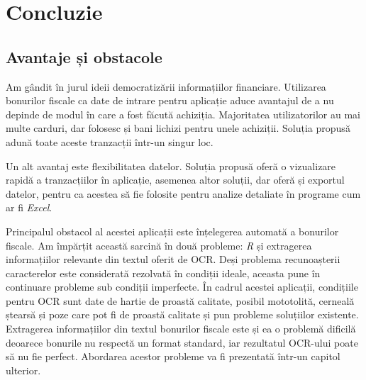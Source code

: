 \chapter{Concluzie}

\section{Avantaje și obstacole}\label{avantaje_obstacole_intro}

Am gândit \AppName{} în jurul ideii democratizării informațiilor financiare. Utilizarea bonurilor fiscale ca date de intrare pentru aplicație aduce avantajul de a nu depinde de modul în care a fost făcută achiziția. Majoritatea utilizatorilor au mai multe carduri, dar folosesc și bani lichizi pentru unele achiziții. Soluția propusă adună toate aceste tranzacții într-un singur loc.

Un alt avantaj este flexibilitatea datelor. Soluția propusă oferă o vizualizare rapidă a tranzacțiilor în aplicație, asemenea altor soluții, dar oferă și exportul datelor, pentru ca acestea să fie folosite pentru analize detaliate în programe cum ar fi \emph{Excel}.

Principalul obstacol al acestei aplicații este înțelegerea automată a bonurilor fiscale. Am împărțit această sarcină în două probleme: \emph{R} și extragerea informațiilor relevante din textul oferit de OCR. Deși problema recunoașterii caracterelor este considerată rezolvată în condiții ideale, aceasta pune în continuare probleme sub condiții imperfecte. În cadrul acestei aplicații, condițiile pentru OCR sunt date de hartie de proastă calitate, posibil mototolită, cerneală ștearsă și poze care pot fi de proastă calitate și pun probleme soluțiilor existente. Extragerea informațiilor din textul bonurilor fiscale este și ea o problemă dificilă deoarece bonurile nu respectă un format standard, iar rezultatul OCR-ului poate să nu fie perfect. Abordarea acestor probleme va fi prezentată într-un capitol ulterior.
